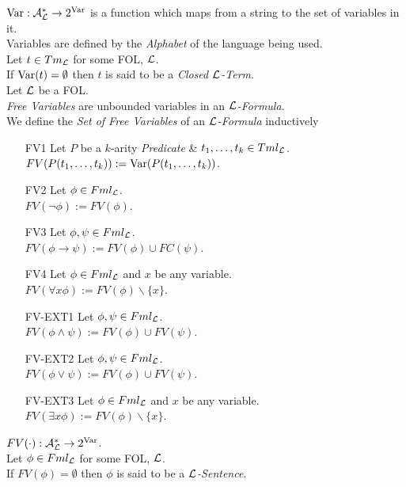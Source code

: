 \documentclass[11pt,a4paper]{article}
\begin{document}
$\mathrm{Var}:\mathcal{A}^*_{\mathcal{L}}\to 2^{\mathrm{Var}}$ is a function which maps from a string to the set of variables in it.\\
Variables are defined by the \textit{Alphabet} of the language being used.\\

Let $t\in Tm_{\mathcal{L}}$ for some FOL, $\mathcal{L}$.\\
If $\mathrm{Var}(t)=\emptyset$ then $t$ is said to be a \textit{Closed $\mathcal{L}$-Term}.\\

Let $\mathcal{L}$ be a FOL.\\
\textit{Free Variables} are unbounded variables in an \textit{$\mathcal{L}$-Formula}.\\
We define the \textit{Set of Free Variables} of an \textit{$\mathcal{L}$-Formula} inductively
\begin{itemize}
	\item[FV1] Let $P$ be a $k$-arity \textit{Predicate} \& $t_1,\dots,t_k\in Tml_{\mathcal{L}}$.\\
	$FV(P(t_1,\dots,t_k)):=\mathrm{Var}(P(t_1,\dots,t_k))$.
	\item[FV2] Let $\phi\in Fml_{\mathcal{L}}$.\\
	$FV(\neg\phi):=FV(\phi)$.
	\item[FV3] Let $\phi,\psi\in Fml_{\mathcal{L}}$.\\
	$FV(\phi\to\psi):=FV(\phi)\cup FC(\psi)$.
	\item[FV4] Let $\phi\in Fml_{\mathcal{L}}$ and $x$ be any variable.\\
	$FV(\forall x\phi):=FV(\phi)\backslash\{x\}$.
	\item[FV-EXT1]Let $\phi,\psi\in Fml_{\mathcal{L}}$.\\
	$FV(\phi\wedge\psi):=FV(\phi)\cup FV(\psi)$.
	\item[FV-EXT2]Let $\phi,\psi\in Fml_{\mathcal{L}}$.\\
	$FV(\phi\vee\psi):=FV(\phi)\cup FV(\psi)$.
	\item[FV-EXT3]Let $\phi\in Fml_{\mathcal{L}}$ and $x$ be any variable.\\
	$FV(\exists x\phi):=FV(\phi)\backslash\{x\}$.
\end{itemize}
\nb $FV(\cdot):\mathcal{A}^*_{\mathcal{L}}\to2^{\mathrm{Var}}$.\\

Let $\phi\in Fml_{\mathcal{L}}$ for some FOL, $\mathcal{L}$.\\
If $FV(\phi)=\emptyset$ then $\phi$ is said to be a \textit{$\mathcal{L}$-Sentence}.\\
\end{document}

